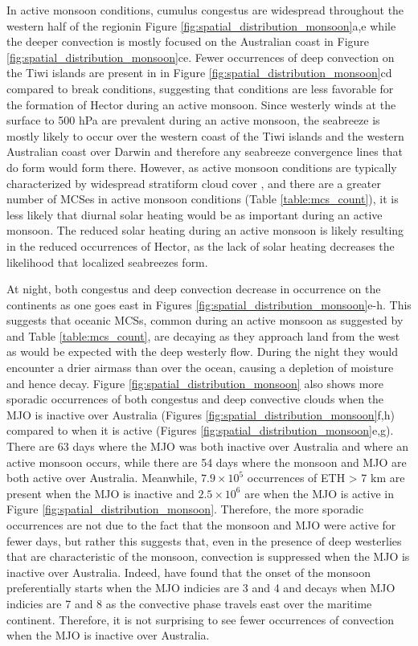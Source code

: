 \documentclass[journal abbreviation, manuscript]{copernicus}
\begin{document}
    In active monsoon conditions, cumulus congestus are widespread throughout the western half of the regionin Figure \ref{fig:spatial_distribution_monsoon}a,e while the deeper convection is mostly focused on the Australian coast in Figure \ref{fig:spatial_distribution_monsoon}ce. Fewer occurrences of deep convection on the Tiwi islands are present in in Figure \ref{fig:spatial_distribution_monsoon}cd compared to break conditions, suggesting that conditions are less favorable for the formation of Hector during an active monsoon. Since westerly winds at the surface to 500 hPa are prevalent during an active monsoon, the seabreeze is mostly likely to occur over the western coast of the Tiwi islands and the western Australian coast over Darwin and therefore any seabreeze convergence lines that do form would form there. However, as active monsoon conditions are typically characterized by widespread stratiform cloud cover \citep{Mayetal2012}, and there are a greater number of MCSes in active monsoon conditions (Table \ref{table:mcs_count}), it is less likely that diurnal solar heating would be as important during an active monsoon. The reduced solar heating during an active monsoon is likely resulting in the reduced occurrences of Hector, as the lack of solar heating decreases the likelihood that localized seabreezes form. 
    
    At night, both congestus and deep convection decrease in occurrence on the continents as one goes east in Figures \ref{fig:spatial_distribution_monsoon}e-h. This suggests that oceanic MCSs, common during an active monsoon as suggested by \cite{Mayetal2012} and Table \ref{table:mcs_count}, are decaying as they approach land from the west as would be expected with the deep westerly flow. During the night they would encounter a drier airmass than over the ocean, causing a depletion of moisture and hence decay. Figure \ref{fig:spatial_distribution_monsoon} also shows more sporadic occurrences of both congestus and deep convective clouds when the MJO is inactive over Australia (Figures \ref{fig:spatial_distribution_monsoon}f,h) compared to when it is active (Figures \ref{fig:spatial_distribution_monsoon}e,g). There are 63 days where the MJO was both inactive over Australia and where an active monsoon occurs, while there are 54 days where the monsoon and MJO are both active over Australia. Meanwhile, $7.9\times10^{5}$ occurrences of ETH > 7 km are present when the MJO is inactive and $2.5\times10^{6}$ are when the MJO is active in Figure \ref{fig:spatial_distribution_monsoon}. Therefore, the more sporadic occurrences are not due to the fact that the monsoon and MJO were active for fewer days, but rather this suggests that, even in the presence of deep westerlies that are characteristic of the monsoon, convection is suppressed when the MJO is inactive over Australia. Indeed, \cite{Evansetal2014} have found that the onset of the monsoon preferentially starts when the MJO indicies are 3 and 4 and decays when MJO indicies are 7 and 8 as the convective phase travels east over the maritime continent. Therefore, it is not surprising to see fewer occurrences of convection when the MJO is inactive over Australia.
\end{document}
